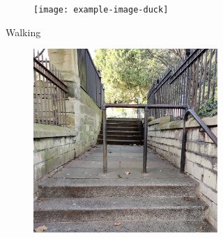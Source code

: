 \begin{figure}[!hbtp]
\begin{subfigure}[b]{\textwidth}
\begin{subfigure}[b]{0.32\textwidth}
        \end{subfigure}
        \hfill
        \begin{subfigure}[b]{0.32\textwidth}
             \centering
             \texttt{[image: example-image-duck]}
        \end{subfigure}
        \caption{Walking}
        \label{fig:methods-flat-example}
      \end{subfigure}
      \newline
      
      \begin{subfigure}[b]{\textwidth}
         \centering
         \begin{subfigure}[b]{0.32\textwidth}
             \centering
             \includegraphics[width=\textwidth]{content/3-Methods/enviroments/stair_1_modified.jpg}
        \end{subfigure}
        \hfill
         \begin{subfigure}[b]{0.32\textwidth}
             \centering

\end{subfigure}
\end{subfigure}
\end{figure}
